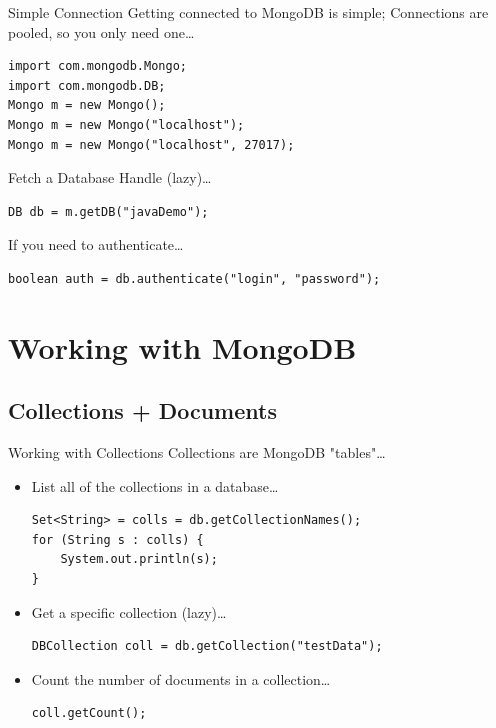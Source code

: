 \documentclass{beamer}
\begin{document}
\begin{frame}[fragile]{Simple Connection}
    Getting connected to MongoDB is simple; 
    Connections are pooled, so you only need one\dots\\
\begin{lstlisting} 
import com.mongodb.Mongo;
import com.mongodb.DB;
Mongo m = new Mongo();
Mongo m = new Mongo("localhost");
Mongo m = new Mongo("localhost", 27017);
\end{lstlisting}
\pause
Fetch a Database Handle (lazy)\dots
\begin{lstlisting}
DB db = m.getDB("javaDemo");
\end{lstlisting}
\pause
If you need to authenticate\dots
\begin{lstlisting}
boolean auth = db.authenticate("login", "password");
\end{lstlisting}

\end{frame}

\section{Working with MongoDB}

\subsection[Collections + Documents]{Collections + Documents}

\begin{frame}[fragile]{Working with Collections}
    Collections are MongoDB "tables"\dots
    \pause
    \begin{itemize}
        \item List all of the collections in a database\dots \\
\begin{lstlisting}
Set<String> = colls = db.getCollectionNames();
for (String s : colls) {
    System.out.println(s);
}
\end{lstlisting}
        \item Get a specific collection (lazy)\dots \\
\begin{lstlisting}
DBCollection coll = db.getCollection("testData");
\end{lstlisting}
        \item Count the number of documents in a collection\dots \\
\begin{lstlisting}
coll.getCount(); 
\end{lstlisting}
    \end{itemize}
\end{frame}
\end{document}
